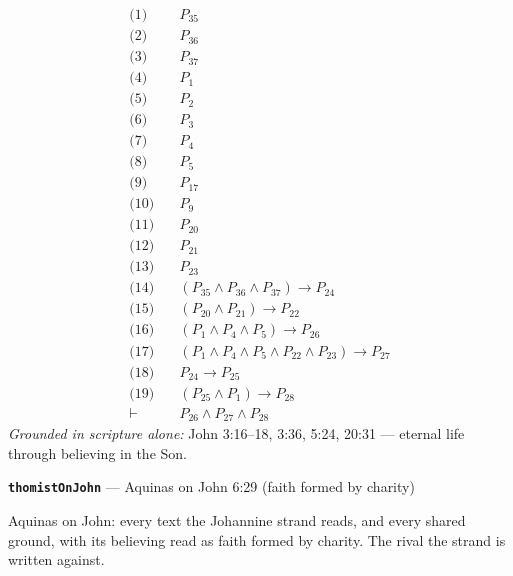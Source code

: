 \documentclass[11pt]{article}
\begin{document}
\begin{align*}
  \text{(1)} \quad & P_{35} \\
  \text{(2)} \quad & P_{36} \\
  \text{(3)} \quad & P_{37} \\
  \text{(4)} \quad & P_{1} \\
  \text{(5)} \quad & P_{2} \\
  \text{(6)} \quad & P_{3} \\
  \text{(7)} \quad & P_{4} \\
  \text{(8)} \quad & P_{5} \\
  \text{(9)} \quad & P_{17} \\
  \text{(10)} \quad & P_{9} \\
  \text{(11)} \quad & P_{20} \\
  \text{(12)} \quad & P_{21} \\
  \text{(13)} \quad & P_{23} \\
  \text{(14)} \quad & (P_{35} \land P_{36} \land P_{37}) \rightarrow P_{24} \\
  \text{(15)} \quad & (P_{20} \land P_{21}) \rightarrow P_{22} \\
  \text{(16)} \quad & (P_{1} \land P_{4} \land P_{5}) \rightarrow P_{26} \\
  \text{(17)} \quad & (P_{1} \land P_{4} \land P_{5} \land P_{22} \land P_{23}) \rightarrow P_{27} \\
  \text{(18)} \quad & P_{24} \rightarrow P_{25} \\
  \text{(19)} \quad & (P_{25} \land P_{1}) \rightarrow P_{28} \\
  \vdash \quad & P_{26} \land P_{27} \land P_{28}
\end{align*}
\emph{Grounded in scripture alone:} John 3:16–18, 3:36, 5:24, 20:31 — eternal life through believing in the Son.
\par\medskip\noindent\textbf{\texttt{thomist\allowbreak{}On\allowbreak{}John}} --- Aquinas on John 6:29 (faith formed by charity)\par\nobreak\noindent
Aquinas on John: every text the Johannine strand reads, and every shared ground, with its believing read as faith formed by charity. The rival the strand is written against.
\end{document}
